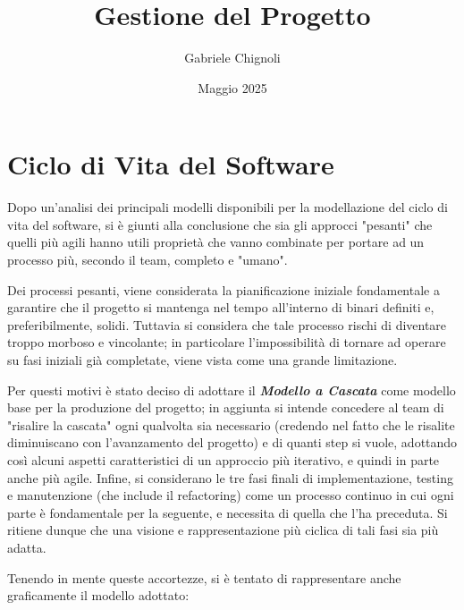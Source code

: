 \documentclass{article}
\title{\huge Gestione del Progetto}
\author{Gabriele Chignoli}
\date{Maggio 2025}
\begin{document}
\maketitle
\tableofcontents
\newpage

\section{Ciclo di Vita del Software}
Dopo un'analisi dei principali modelli disponibili per la modellazione del ciclo di vita del software, si è giunti alla conclusione che sia gli approcci "pesanti" che quelli più agili hanno utili proprietà che vanno combinate per portare ad un processo più, secondo il team, completo e "umano".  \newline 

Dei processi pesanti, viene considerata la pianificazione iniziale fondamentale a garantire che il progetto si mantenga nel tempo all'interno di binari definiti e, preferibilmente, solidi. Tuttavia si considera che tale processo rischi di diventare troppo morboso e vincolante; in particolare l'impossibilità di tornare ad operare su fasi iniziali già completate, viene vista come una grande limitazione. 

Per questi motivi è stato deciso di adottare il \textbf{\textit{Modello a Cascata}} come modello base per la produzione del progetto; in aggiunta si intende concedere al team di  "risalire la cascata" ogni qualvolta sia necessario (credendo nel fatto che le risalite diminuiscano con l'avanzamento del progetto) e di quanti step si vuole, adottando così alcuni aspetti caratteristici di un approccio più iterativo, e quindi in parte anche più agile. Infine, si considerano le tre fasi finali di implementazione, testing e manutenzione (che include il refactoring) come un processo continuo in cui ogni parte è fondamentale per la seguente, e necessita di quella che l'ha preceduta. Si ritiene dunque che una visione e rappresentazione più ciclica di tali fasi sia più adatta. \newline 

Tenendo in mente queste accortezze, si è tentato di rappresentare anche graficamente il modello adottato:
\end{document}
